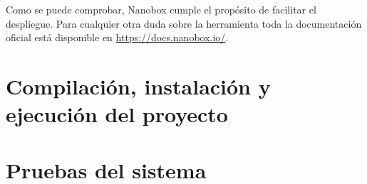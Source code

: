 Como se puede comprobar, Nanobox cumple el propósito de facilitar el despliegue. Para cualquier otra duda sobre la herramienta toda la documentación oficial está disponible en \url{https://docs.nanobox.io/}.\\
\section{Compilación, instalación y ejecución del proyecto}

\section{Pruebas del sistema}
